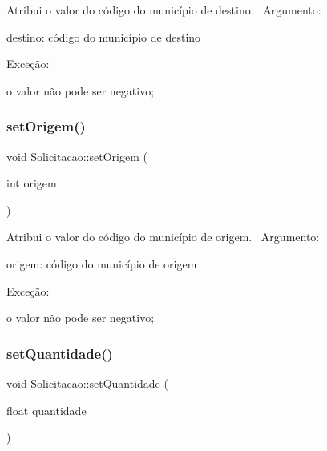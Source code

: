 Atribui o valor do código do município de destino.~\newline
 Argumento\+:
\begin{DoxyItemize}
\item destino\+: código do município de destino
\end{DoxyItemize}

Exceção\+:
\begin{DoxyItemize}
\item o valor não pode ser negativo;
\end{DoxyItemize}\mbox{\label{classSolicitacao_a585f55cfa44c1e16d535935eead17f44}} 
\subsubsection{\texorpdfstring{set\+Origem()}{setOrigem()}}
{\footnotesize\ttfamily void Solicitacao\+::set\+Origem (\begin{DoxyParamCaption}\item[{int}]{origem }\end{DoxyParamCaption})}

Atribui o valor do código do município de origem.~\newline
 Argumento\+:
\begin{DoxyItemize}
\item origem\+: código do município de origem
\end{DoxyItemize}

Exceção\+:
\begin{DoxyItemize}
\item o valor não pode ser negativo;
\end{DoxyItemize}\mbox{\label{classSolicitacao_acf1db9c6843df635aca0bbacae8cf7c7}} 
\subsubsection{\texorpdfstring{set\+Quantidade()}{setQuantidade()}}
{\footnotesize\ttfamily void Solicitacao\+::set\+Quantidade (\begin{DoxyParamCaption}\item[{float}]{quantidade }\end{DoxyParamCaption})}

